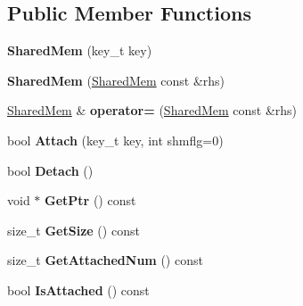 \subsection*{Public Member Functions}
\begin{DoxyCompactItemize}
\item 
\hypertarget{classlsf_1_1container_1_1SharedMem_a98877c888e855265e04d618cbe876cbe}{
{\bfseries SharedMem} (key\_\-t key)}
\label{classlsf_1_1container_1_1SharedMem_a98877c888e855265e04d618cbe876cbe}

\item 
\hypertarget{classlsf_1_1container_1_1SharedMem_acc284fb5d44ad727f10dc6290fdf5d6d}{
{\bfseries SharedMem} (\hyperlink{classlsf_1_1container_1_1SharedMem}{SharedMem} const \&rhs)}
\label{classlsf_1_1container_1_1SharedMem_acc284fb5d44ad727f10dc6290fdf5d6d}

\item 
\hypertarget{classlsf_1_1container_1_1SharedMem_a83c8b22abff5d2770f3e2a418802b356}{
\hyperlink{classlsf_1_1container_1_1SharedMem}{SharedMem} \& {\bfseries operator=} (\hyperlink{classlsf_1_1container_1_1SharedMem}{SharedMem} const \&rhs)}
\label{classlsf_1_1container_1_1SharedMem_a83c8b22abff5d2770f3e2a418802b356}

\item 
\hypertarget{classlsf_1_1container_1_1SharedMem_abeddda984e85d1d967178d58715aa467}{
bool {\bfseries Attach} (key\_\-t key, int shmflg=0)}
\label{classlsf_1_1container_1_1SharedMem_abeddda984e85d1d967178d58715aa467}

\item 
\hypertarget{classlsf_1_1container_1_1SharedMem_a4a357ee297d212b0db8916b909b510c7}{
bool {\bfseries Detach} ()}
\label{classlsf_1_1container_1_1SharedMem_a4a357ee297d212b0db8916b909b510c7}

\item 
\hypertarget{classlsf_1_1container_1_1SharedMem_a4aa4c93a1d739800eb578f8176214089}{
void $\ast$ {\bfseries GetPtr} () const }
\label{classlsf_1_1container_1_1SharedMem_a4aa4c93a1d739800eb578f8176214089}

\item 
\hypertarget{classlsf_1_1container_1_1SharedMem_a749e93ea01ea8761a042003852e07dab}{
size\_\-t {\bfseries GetSize} () const }
\label{classlsf_1_1container_1_1SharedMem_a749e93ea01ea8761a042003852e07dab}

\item 
\hypertarget{classlsf_1_1container_1_1SharedMem_af79d1649d45742a6390e9e6193e139ff}{
size\_\-t {\bfseries GetAttachedNum} () const }
\label{classlsf_1_1container_1_1SharedMem_af79d1649d45742a6390e9e6193e139ff}

\item 
\hypertarget{classlsf_1_1container_1_1SharedMem_a455698076d6302f26892bac316b3ec80}{
bool {\bfseries IsAttached} () const }
\label{classlsf_1_1container_1_1SharedMem_a455698076d6302f26892bac316b3ec80}

\end{DoxyCompactItemize}
